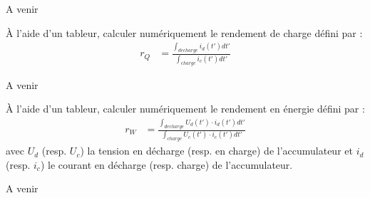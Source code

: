 \documentclass[twoside,a4paper,11pt,answers,addpoints]{exam}
\newcounter{foo} %
\begin{document}
\begin{questions}
\begin{framed}
\begin{solution}
A venir
\end{solution}
\end{framed}


\begin{framed}
\question[1] \`{A} l'aide d'un tableur, calculer numériquement le rendement de charge défini par : 
\begin{align}
r_Q &= \frac{\int_{decharge} i_d (t') dt' }{\int_{charge} i_c(t') dt' }
\end{align} 

\begin{solution}
A venir
\end{solution}
\end{framed}

\begin{framed}
\question \`{A} l'aide d'un tableur, calculer numériquement le rendement en énergie défini par :
\begin{align}
r_W &= \frac{\int_{decharge} U_d (t') \cdot i_d (t') dt' }{\int_{charge} U_c(t') \cdot i_c(t') dt' }
\end{align} 
avec $U_d$ (resp. $U_c$) la tension en décharge (resp. en charge) de l'accumulateur et $i_d$ (resp. $i_c$) le courant en décharge (resp. charge) de l'accumulateur.


\begin{solution}
A venir
\end{solution}
\end{framed}

\setcounter{foo}{\value{question}}
\end{questions}
\end{document}
